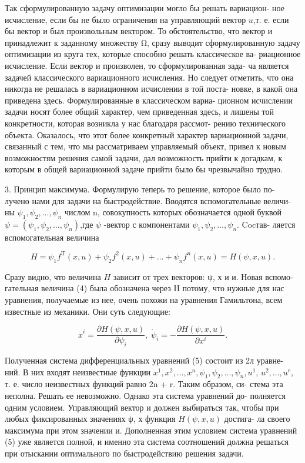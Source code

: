 \documentclass[10pt]{article}
\begin{document}
Так сформулированную задачу оптимизации могло бы решать вариацион- ное исчисление, если бы не было ограничения на управляющий вектор \(u\),т. е. если бы вектор и был произвольным вектором. То обстоятельство, что вектор и принадлежит к заданному множеству Ω, сразу выводит сформулированную задачу оптимизации из круга тех, которые способно решать классическое ва- риационное исчисление. Если вектор и произволен, то сформулированная зада- ча является задачей классического вариационного исчисления. Но следует отметить, что она никогда не решалась в вариационном исчислении в той поста- новке, в какой она приведена здесь. Формулированные в классическом вариа- ционном исчислении задачи носят более общий характер, чем приведенная здесь, и лишены той конкретности, которая возникла у нас благодаря рассмот- рению технического объекта. Оказалось, что этот более конкретный характер вариационной задачи, связанный с тем, что мы рассматриваем управляемый объект, привел к новым возможностям решения самой задачи, дал возможность прийти к догадкам, к которым в общей вариационной задаче прийти было бы чрезвычайно трудно.

3. Принцип максимума. Формулирую теперь то решение, которое было по- лучено нами для задачи на быстродействие. Вводятся вспомогательные величи- ны \({\psi }_{1},{\psi }_{2},\ldots,{\psi }_{n}\) числом n, совокупность которых обозначается одной буквой \(\psi  = \left( {{\psi }_{1},{\psi }_{2},\ldots,{\psi }_{n}}\right)\),где \(\psi\) -вектор с компонентами \({\psi }_{1},{\psi }_{2},\ldots,{\psi }_{n}\). Cocтав- ляется вспомогательная величина

\[
H = {\psi }_{1}{f}^{\mathrm{T}}\left( {x,u}\right)  + {\psi }_{2}{f}^{2}\left( {x,u}\right)  + \ldots  + {\psi }_{n}{f}^{n}\left( {x,u}\right)  = H\left( {\psi,x,u}\right). \tag{4}
\]

Сразу видно, что величина \(H\) зависит от трех векторов: ψ, х и и. Новая вспомо- гательная величина (4) была обозначена через H потому, что нужные для нас уравнения, получаемые из нее, очень похожи на уравнения Гамильтона, всем известные из механики. Они суть следующие:

\[
{\dot{x}}^{i} = \frac{\partial H\left( {\psi,x,u}\right) }{\partial {\psi }_{i}},\;{\dot{\psi }}_{i} =  - \frac{\partial H\left( {\psi,x,u}\right) }{\partial {x}^{i}}. \tag{5}
\]

Полученная система дифференциальных уравнений (5) состоит из 2л уравне- ний. В них входят неизвестные функции \({x}^{1},{x}^{2},\ldots,{x}^{n},{\psi }_{1},{\psi }_{2},\ldots,{\psi }_{n},{u}^{1}\), \({u}^{2},\ldots,{u}^{r}\), т. е. число неизвестных функций равно 2n + r. Таким образом, си- стема эта неполна. Решать ее невозможно. Однако эта система уравнений до- полняется одним условием. Управляющий вектор и должен выбираться так, чтобы при любых фиксированных значениях ψ, х функция \(H\left( {\psi,x,u}\right)\) достига- ла своего максимума при этом значении и. Дополненная этим условием система уравнений (5) уже является полной, и именно эта система соотношений должна решаться при отыскании оптимального по быстродействию решения задачи.
\end{document}

